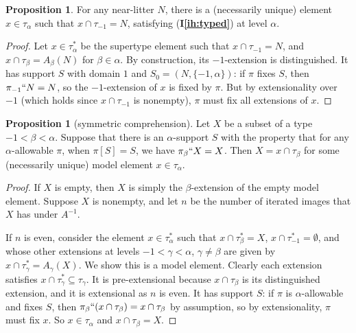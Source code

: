 \documentclass{article}
\theoremstyle{definition}
\newtheorem{proposition}[theorem]{Proposition}
\theoremstyle{remark}
\newcommand{\ihref}[1]{(\textbf{I\ref{#1}})}
\begin{document}
{\begin{proposition}
  For any near-litter $N$, there is a (necessarily unique) element $x \in \tau_\alpha$ such that $x \cap \tau_{-1} = N$, satisfying \ihref{ih:typed} at level $\alpha$.
\end{proposition}
\begin{proof}
  Let $x \in \tau_\alpha^*$ be the supertype element such that $x \cap \tau_{-1} = N$, and $x \cap \tau_\beta = A_\beta(N)$ for $\beta \in \alpha$.
  By construction, its $-1$-extension is distinguished.
  It has support $S$ with domain $1$ and $S_0 = (N, \{-1,\alpha\})$: if $\pi$ fixes $S$, then $\pi_{-1}``N = N$, so the $-1$-extension of $x$ is fixed by $\pi$.
  But by extensionality over $-1$ (which holds since $x \cap \tau_{-1}$ is nonempty), $\pi$ must fix all extensions of $x$.
\end{proof}

\begin{proposition}[symmetric comprehension]\label{prop:symmetric_comprehension}
Let $X$ be a subset of a type $-1 < \beta < \alpha$.
Suppose that there is an $\alpha$-support $S$ with the property that for any $\alpha$-allowable $\pi$, when $\pi[S] = S$, we have $\pi_\beta``X = X$.
Then $X = x \cap \tau_\beta$ for some (necessarily unique) model element $x \in \tau_\alpha$.
\end{proposition}
\begin{proof}
If $X$ is empty, then $X$ is simply the $\beta$-extension of the empty model element.
Suppose $X$ is nonempty, and let $n$ be the number of iterated images that $X$ has under $A^{-1}$.

If $n$ is even, consider the element $x \in \tau^*_\alpha$ such that $x \cap \tau^*_\beta = X$, $x \cap \tau^*_{-1} = \emptyset$, and whose other extensions at levels $-1 < \gamma < \alpha$, $\gamma \neq \beta$ are given by $x \cap \tau^*_\gamma = A_\gamma(X)$.
We show this is a model element.
Clearly each extension satisfies $x \cap \tau^*_\gamma \subseteq \tau_\gamma$.
It is pre-extensional because $x \cap \tau_\beta$ is its distinguished extension, and it is extensional as $n$ is even.
It has support $S$: if $\pi$ is $\alpha$-allowable and fixes $S$, then $\pi_\beta `` (x \cap \tau_\beta) = x \cap \tau_\beta$ by assumption, so by extensionality, $\pi$ must fix $x$.
So $x \in \tau_\alpha$ and $x \cap \tau_\beta = X$.


\end{proof}}
\end{document}
